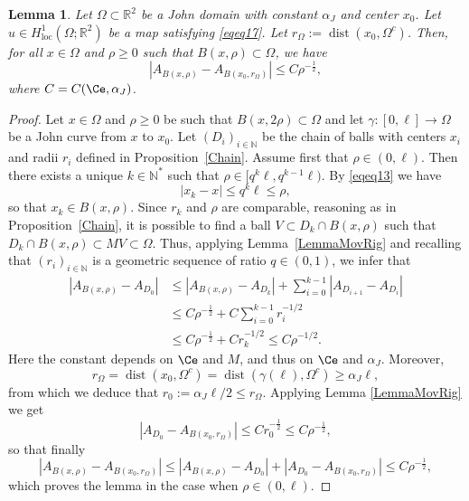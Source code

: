 \documentclass[12pt]{article}
\newtheorem{lemma}[theorem]{Lemma}
\theoremstyle{definition}
\theoremstyle{remark}
\numberwithin{equation}{section}
\DeclareMathOperator{\dist}{dist}
\newcommand{\R}{\mathbb{R}}
\newcommand{\N}{\mathbb{N}}
\begin{document}
 
\begin{lemma}
    \label{LemmaMovRig3}
    Let $\Omega \subset \R^2$ be a John domain with constant $\alpha_J$ and center $x_0$.
    Let $u \in H^1_{\mathrm{loc}}(\Omega;\R^2)$ be a map satisfying \eqref{eqeq17}.
    Let $r_\Omega:=\dist(x_0,\Omega^c)$.  Then, for all $x\in \Omega$ and  $\rho\geq 0$ such that $B(x,\rho)\subset\Omega$, we have
    \begin{equation}
        |A_{B(x,\rho)} - A_{B(x_0, r_\Omega)}|\leq C\rho^{-\frac{1}{2}}, \label{mainESTIM1}
    \end{equation}
    where   $C=C(\Ce,\alpha_J)$.
\end{lemma}
\begin{proof}
    Let    $x\in \Omega$ and  $\rho  \geq 0$ be such that $B(x,2\rho)\subset\Omega$ and let $\gamma : [0,\ell]
    \longrightarrow \Omega$ be a John curve from $x$ to $x_0$. Let $(D_i)_{i\in\N}$ be the chain of balls with centers $x_i$ and radii $r_i$ defined in Proposition~\ref{Chain}.
    Assume first that $\rho \in (0,\ell)$. Then there exists a unique $k\in\N^*$  such that $\rho\in[q^k\ell,q^{k-1}\ell)$.
    By \eqref{eqeq13} we have
    \begin{equation}
        |x_k-x|\leq q^k\ell\leq\rho,
    \end{equation}
    so that $x_k \in B(x,\rho)$.
    Since $r_k$ and $\rho$ are comparable, reasoning as in Proposition~\ref{Chain}, it is possible to find a ball $V\subset D_k \cap B(x,\rho)$ such that $D_k \cap B(x,\rho)\subset MV\subset \Omega$.
    Thus, applying Lemma~\ref{LemmaMovRig} and recalling that $(r_i)_{i\in\N}$ is a geometric sequence of ratio $q \in (0,1)$, we infer that
    \begin{align}
        |A_{B(x,\rho)} - A_{D_0}| &\leq |A_{B(x,\rho)}-A_{D_k}|+\sum_{i=0}^{k-1} |A_{D_{i+1}}-A_{D_i}|\\
                                  &\leq C \rho^{-\frac{1}{2}} + C \sum_{i=0}^{k-1} r_i^{-1/2}\\
                                  &\leq C \rho^{-\frac{1}{2}} + C r_k^{-1/2} \leq C \rho^{-1/2}.
    \end{align}
    Here the constant depends on $\Ce$ and $M$, and thus on $\Ce$ and $\alpha_J$.  Moreover, 
    \[r_\Omega=\dist(x_0,\Omega^c) =\dist(\gamma(\ell),\Omega^c)\geq \alpha_J \ell,\]
    from which we deduce that $r_0:=\alpha_J \ell /2 \leq  r_\Omega $. Applying Lemma \ref{LemmaMovRig} we get
    \[|A_{D_0} - A_{B(x_0,r_\Omega)} | \leq C r_0^{-\frac{1}{2}}\leq C\rho^{-\frac{1}{2}},\]
    so that finally 
    \[|A_{B(x,\rho)} - A_{B(x_0,r_\Omega)}| \leq |A_{B(x,\rho)} - A_{D_0}| +|A_{D_0} - A_{B(x_0,r_\Omega)} | \leq
    C\rho^{-\frac{1}{2}},\]
    which proves the lemma in the case when $\rho \in (0,\ell)$.



\end{proof}
\end{document}
